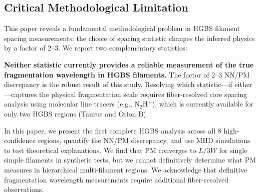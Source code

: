 \documentclass[twoside,twocolumn]{mnras}
\begin{document}
\subsection*{Critical Methodological Limitation}

This paper reveals a fundamental methodological problem in HGBS filament spacing measurements: the choice of spacing statistic changes the inferred physics by a factor of 2--3. We report two complementary statistics:
\textbf{Neither statistic currently provides a reliable measurement of the true fragmentation wavelength in HGBS filaments.} The factor of 2--3 NN/PM discrepancy is the robust result of this study. Resolving which statistic---if either---captures the physical fragmentation scale requires fiber-resolved core spacing analysis using molecular line tracers (e.g., N$_2$H$^+$), which is currently available for only two HGBS regions (Taurus and Orion B).

In this paper, we present the first complete HGBS analysis across all 8 high-confidence regions, quantify the NN/PM discrepancy, and use MHD simulations to test theoretical explanations. We find that PM converges to $L/3W$ for single simple filaments in synthetic tests, but we cannot definitively determine what PM measures in hierarchical multi-filament regions. We acknowledge that definitive fragmentation wavelength measurements require additional fiber-resolved observations.
\end{document}
